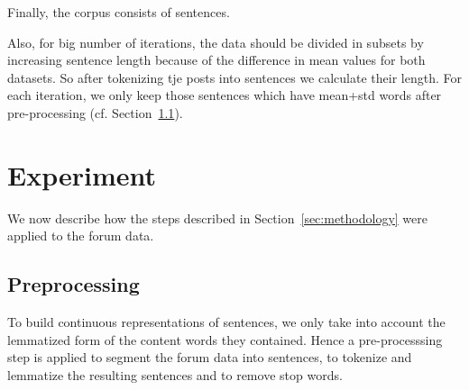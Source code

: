 \documentclass[11pt]{article}
\begin{document}
Finally, the corpus consists of   sentences. 

Also, for big number of iterations, the data should be divided in
subsets by increasing sentence length because of the difference in
mean values for both datasets. So after tokenizing tje posts into
sentences we calculate their length. For each iteration, we only keep
those sentences which have mean+std words after pre-processing
(cf. Section~\ref{subsec:preprocessing}).


\section{Experiment}
\label{sec:xps}

We now describe how the steps described in Section~\ref{sec:methodology} were applied to the forum data.



\subsection{Preprocessing }
\label{subsec:preprocessing}

To build continuous representations of sentences, we only take into
account the lemmatized form of the content words they contained. Hence
a pre-processsing step is applied to segment the forum data into
sentences, to tokenize and lemmatize the resulting sentences and to
remove stop words.
\end{document}

